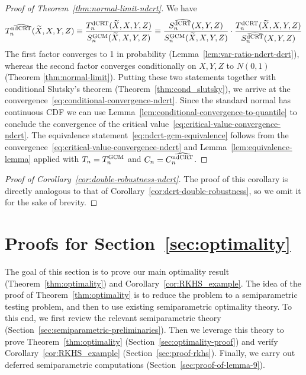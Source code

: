 \documentclass[aos]{imsart}
\theoremstyle{definition}
\theoremstyle{remark}
\newcommand{\srx}{X}									%
\newcommand{\srz}{Z}									%
\newcommand{\srxk}{\widetilde X}						%
\newcommand{\sry}{Y}									%
\newcommand{\dCRT}{\textnormal{dCRT}} 					%
\newcommand{\GCM}{\textnormal{GCM}}						%
\newcommand{\dCRThat}{\widehat{\textnormal{dCRT}}}		%
\newcommand{\ndCRThat}{\widehat{\textnormal{ndCRT}}}	%
\begin{document}
\begin{proof}[Proof of Theorem~\ref{thm:normal-limit-ndcrt}]
We have
\begin{equation*}
T_n^{\ndCRThat}(\srxk, \srx, \sry, \srz) \equiv \frac{T_n^{\dCRT}(\srxk, \srx, \sry, \srz)}{S_n^{\GCM}(\srxk, \srx, \sry, \srz)} \equiv  \frac{S_n^{\dCRThat}(\srx, \sry, \srz)}{S_n^{\GCM}(\srxk, \srx, \sry, \srz)} \cdot \frac{T_n^{\dCRT}(\srxk, \srx, \sry, \srz)}{S_n^{\dCRThat}(\srx, \sry, \srz)}
\end{equation*}
The first factor converges to 1 in probability (Lemma~\ref{lem:var-ratio-ndcrt-dcrt}), whereas the second factor converges conditionally on $\srx, \sry, \srz$ to $N(0,1)$ (Theorem \ref{thm:normal-limit}). Putting these two statements together with conditional Slutsky's theorem (Theorem~\ref{thm:cond_slutsky}), we arrive at the convergence~\eqref{eq:conditional-convergence-ndcrt}. Since the standard normal has continuous CDF we can use Lemma~\ref{lem:conditional-convergence-to-quantile} to conclude the convergence of the critical value~\eqref{eq:critical-value-convergence-ndcrt}. The equivalence statement~\eqref{eq:ndcrt-gcm-equivalence} follows from the convergence~\eqref{eq:critical-value-convergence-ndcrt} and Lemma~\ref{lem:equivalence-lemma} applied with $T_n = T_n^{\GCM}$ and $C_n = C_n^{\ndCRThat}$.
\end{proof}

\begin{proof}[Proof of Corollary~\ref{cor:double-robustness-ndcrt}] 
 
The proof of this corollary is directly analogous to that of Corollary~\ref{cor:dcrt-double-robustness}, so we omit it for the sake of brevity.

\end{proof}

\section{Proofs for Section~\ref{sec:optimality}} \label{sec:optimality-proofs}

The goal of this section is to prove our main optimality result (Theorem~\ref{thm:optimality}) and Corollary~\ref{cor:RKHS_example}. The idea of the proof of Theorem~\ref{thm:optimality} is to reduce the problem to a semiparametric testing problem, and then to use existing semiparametric optimality theory. To this end, we first review the relevant semiparametric theory (Section~\ref{sec:semiparametric-preliminaries}). Then we leverage this theory to prove Theorem~\ref{thm:optimality} (Section~\ref{sec:optimality-proof}) and verify Corollary~\ref{cor:RKHS_example} (Section~\ref{sec:proof-rkhs}). Finally, we carry out deferred semiparametric computations (Section~\ref{sec:proof-of-lemma-9}).
\end{document}
